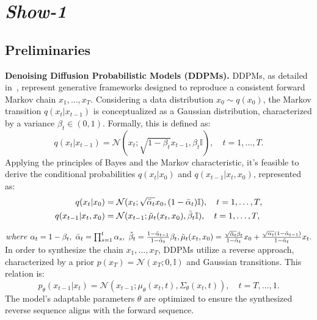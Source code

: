 \documentclass{article} \usepackage{iclr2024_conference,times}
\begin{document}
\vspace{-3mm}

\section{\textit{Show-1}}
\subsection{Preliminaries}

\noindent\textbf{Denoising Diffusion Probabilistic Models (DDPMs).} DDPMs, as detailed in~\citep{ho2020denoising}, represent generative frameworks designed to reproduce a consistent forward Markov chain $x_1, \ldots, x_T$. 
Considering a data distribution  $x_0 \sim q(x_0)$, the Markov transition $q(x_t|x_{t-1})$ is conceptualized as a Gaussian distribution, characterized by a variance $\beta_t \in (0, 1)$. Formally, this is defined as:
{\small
\begin{equation}
    q(x_t|x_{t-1}) = \mathcal{N}(x_t; \sqrt{1-\beta_t} x_{t-1}, \beta_t \mathbb{I}), \quad t = 1, \ldots, T.
\end{equation}}Applying the principles of Bayes and the Markov characteristic, it's feasible to derive the conditional probabilities $q(x_t|x_0)$ and $q(x_{t-1}|x_t, x_0)$, represented as:
{\small
\begin{align}
    q(x_t|x_0) & = \mathcal{N}(x_t; \sqrt{\Bar{\alpha}_t} x_0, (1 - \Bar{\alpha}_t) \mathbb{I}), \quad t = 1, \ldots, T, \\
    q(x_{t-1}|x_t, x_0) & = \mathcal{N}(x_{t-1}; \Tilde{\mu}_t(x_t, x_0), \Tilde{\beta}_t \mathbb{I}), \quad t = 1, \ldots, T, 
\end{align}
}

  $where~\alpha_t = 1 - \beta_t, ~ \Bar{\alpha}_t = \prod_{s=1}^t \alpha_s, ~ \Tilde{\beta}_t = \frac{1 - \Bar{\alpha}_{t-1}}{1 - \Bar{\alpha}_t} \beta_t, 
    \Tilde{\mu}_t(x_t, x_0) = \frac{\sqrt{\Bar{\alpha}_t}\beta_t}{1 - \Bar{\alpha}_t} x_0 + \frac{\sqrt{{\alpha}_t} (1 - \Bar{\alpha}_{t-1})}{1 - \Bar{\alpha}_t} x_t.$
In order to synthesize the chain $x_1, \ldots, x_T$, DDPMs utilize a reverse approach, characterized by a prior $p(x_T) = \mathcal{N}(x_T; 0, \mathbb{I})$ and Gaussian transitions. This relation is:
{\small
\begin{equation}
    p_\theta(x_{t-1}|x_t) = \mathcal{N}(x_{t-1}; \mu_\theta (x_t, t), \Sigma_\theta(x_t, t)), \quad t = T, \ldots, 1.
\end{equation}}The model's adaptable parameters $\theta$ are optimized to ensure the synthesized reverse sequence aligns with the forward sequence.
\end{document}
